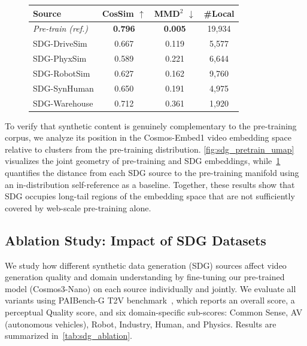 \documentclass{llmxive}
\providecommand{\arraystretch}{1.5}
\begin{document}
\begin{figure}[t]
\begin{minipage}[t]{0.43\linewidth}
        \label{tab:sdg_pretrain_dist}
        \footnotesize
        \setlength{\tabcolsep}{4pt}
        \renewcommand{\arraystretch}{1.15}
        \begin{tabular}{lccc}
            \toprule
            Source & CosSim $\uparrow$ & MMD$^2$ $\downarrow$ & \#Local \\
            \midrule
            \textit{Pre-train (ref.)} & \textbf{0.796} & \textbf{0.005} & 19{,}934 \\
            \midrule
            SDG-DriveSim   & 0.667 & 0.119 & 5{,}577 \\
            SDG-PhyxSim    & 0.589 & 0.221 & 6{,}644 \\
            SDG-RobotSim   & 0.627 & 0.162 & 9{,}760 \\
            SDG-SynHuman   & 0.650 & 0.191 & 4{,}975 \\
            SDG-Warehouse  & 0.712 & 0.361 & 1{,}920 \\
            \bottomrule
        \end{tabular}
    \end{minipage}
\end{figure}

To verify that synthetic content is genuinely complementary to the pre-training corpus, we analyze its position in the Cosmos-Embed1 video embedding space relative to clusters from the pre-training distribution. \cref{fig:sdg_pretrain_umap} visualizes the joint geometry of pre-training and SDG embeddings, while~\cref{tab:sdg_pretrain_dist} quantifies the distance from each SDG source to the pre-training manifold using an in-distribution self-reference as a baseline. Together, these results show that SDG occupies long-tail regions of the embedding space that are not sufficiently covered by web-scale pre-training alone.

\subsection{Ablation Study: Impact of SDG Datasets}
\label{appendix:sdg_ablation}

We study how different synthetic data generation (SDG) sources affect video generation quality and domain understanding by fine-tuning our pre-trained model (Cosmos3-Nano) on each source individually and jointly. We evaluate all variants using PAIBench-G T2V benchmark~\citep{zhou2025paibench}, which reports an overall score, a perceptual Quality score, and six domain-specific sub-scores: Common Sense, AV (autonomous vehicles), Robot,
Industry, Human, and Physics. Results are summarized in~\cref{tab:sdg_ablation}.
\end{document}

